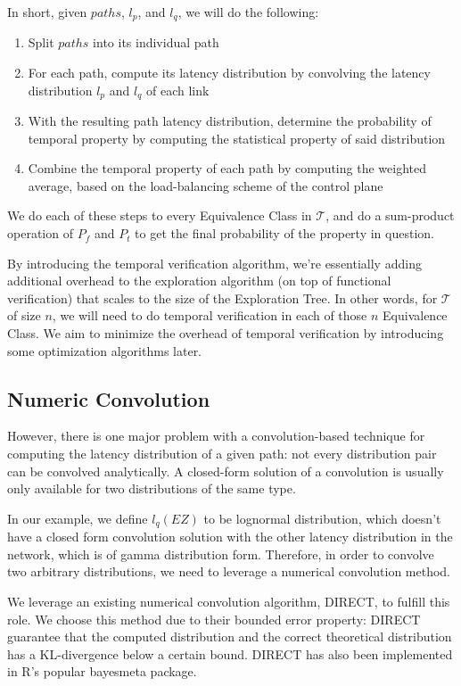 In short, given $paths$, $l_p$, and $l_q$, we will do the following:
\begin{enumerate}
    \item Split $paths$ into its individual path
    \item For each path, compute its latency distribution by convolving the latency distribution 
        $l_p$ and $l_q$ of each link
    \item With the resulting path latency distribution, determine the probability of temporal 
        property by computing the statistical property of said distribution
    \item Combine the temporal property of each path by computing the weighted average, based 
        on the load-balancing scheme of the control plane
\end{enumerate}

We do each of these steps to every Equivalence Class in $\mathcal{T}$, and do a sum-product operation 
of $P_f$ and $P_t$ to get the final probability of the property in question.

By introducing the temporal verification algorithm, we're essentially adding additional overhead to the 
exploration algorithm (on top of functional verification) that scales to the size of the Exploration Tree.
In other words, for $\mathcal{T}$ of size $n$, we will need to do temporal verification in each of 
those $n$ Equivalence Class.
We aim to minimize the overhead of temporal verification by introducing some optimization algorithms
later.

\subsection{Numeric Convolution}
However, there is one major problem with a convolution-based technique for computing the latency distribution 
of a given path: not every distribution pair can be convolved analytically.
A closed-form solution of a convolution is usually only available for two distributions of the same type.

In our example, we define $l_q(EZ)$ to be lognormal distribution, which doesn't have a closed form convolution 
solution with the other latency distribution in the network, which is of gamma distribution form.
Therefore, in order to convolve two arbitrary distributions, we need to leverage a numerical convolution 
method.

We leverage an existing numerical convolution algorithm, DIRECT, to fulfill this role.
We choose this method due to their bounded error property: DIRECT guarantee that the computed 
distribution and the correct theoretical distribution has a KL-divergence below a certain bound.
DIRECT has also been implemented in R's popular bayesmeta package.


